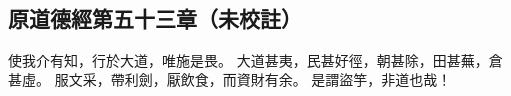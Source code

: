 ﻿%
%

\chapter{~}

\section{原道德經第五十三章（未校註）}

\begin{withgezhu}

\zhsong


\textcolor{tongjia-color}{使我介有知}，行於大道，唯施是畏。
大道甚夷，民甚好徑，朝甚除，田甚蕪，倉甚虛。
服文采，帶利劍，厭飲食，而資財有余。
\textcolor{tongjia-color}{是謂盜竽}，非道也哉！

\end{withgezhu}
